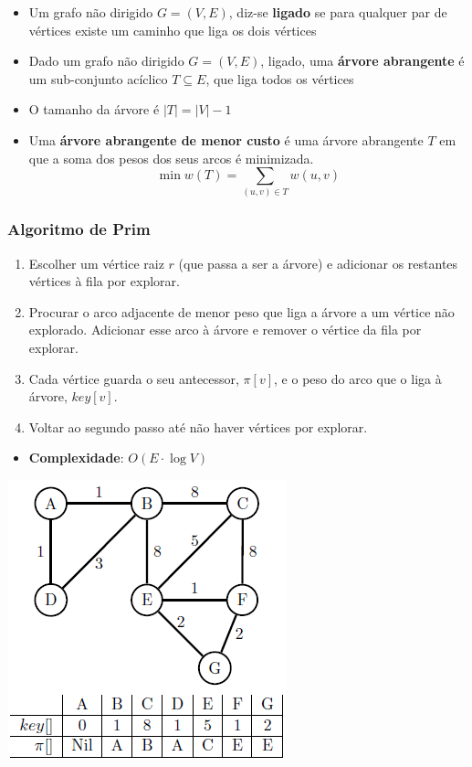 \documentclass[11pt]{article}
\begin{document}
\begin{itemize}[topsep=0pt]
    \item Um grafo não dirigido $G = (V,E)$, diz-se \textbf{ligado} se para qualquer par de vértices existe um caminho que liga os dois vértices
    \item Dado um grafo não dirigido $G = (V,E)$, ligado, uma \textbf{árvore abrangente} é um sub-conjunto acíclico $T \subseteq E$, que liga todos os vértices
    \item O tamanho da árvore é $|T| = |V| - 1$
    \item Uma \textbf{árvore abrangente de menor custo} é uma árvore abrangente $T$ em que a soma dos pesos dos seus arcos é minimizada.
          \begin{equation*}
              \min w(T)=\sum_{(u,v)\in T} w(u,v)
          \end{equation*}
\end{itemize}

\subsubsection{Algoritmo de Prim}

\begin{minipage}{0.65\textwidth}
    \begin{enumerate}
        \item Escolher um vértice raiz $r$ (que passa a ser a árvore) e adicionar os restantes vértices à fila por explorar.
        \item Procurar o arco adjacente de menor peso que liga a árvore a um vértice não explorado. Adicionar esse arco à árvore e remover o vértice da fila por explorar.
        \item Cada vértice guarda o seu antecessor, $\pi[v]$, e o peso do arco que o liga à árvore, $key[v]$.
        \item Voltar ao segundo passo até não haver vértices por explorar.
    \end{enumerate}
    \begin{itemize}
        \item \textbf{Complexidade}: $O(E \cdot \log V)$
    \end{itemize}
\end{minipage}
\begin{minipage}{0.34\textwidth}
    \includegraphics[scale=0.7, right]{prim.png}
\end{minipage}
\end{document}
